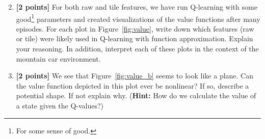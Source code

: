 \documentclass[11pt]{article}
\numberwithin{equation}{section} %
\numberwithin{figure}{section} %
\numberwithin{table}{section} %
\begin{document}
\begin{enumerate}
\setcounter{enumi}{1}
\item \textbf{[2 points]} For both raw and tile features, we have run Q-learning with some good\footnote{For some sense of good.} parameters and created visualizations of the value functions after many episodes. For each plot in Figure~\ref{fig:value}, write down which features (raw or tile) were likely used in Q-learning with function approximation. Explain your reasoning. In addition, interpret each of these plots in the context of the mountain car environment.

\begin{tcolorbox}[fit,height=4cm, width=\linewidth, blank, borderline={1pt}{-2pt},nobeforeafter]
\end{tcolorbox}


\item \textbf{[2 points]} We see that Figure~\ref{fig:value_b} seems to look like a plane. Can the value function depicted in this plot ever be nonlinear? If so, describe a potential shape. If not explain why. (\textbf{Hint:} How do we calculate the value of a state given the Q-values?)


\begin{tcolorbox}[fit,height=4cm, width=\linewidth, blank, borderline={1pt}{-2pt},nobeforeafter]
\end{tcolorbox}

    
\end{enumerate}
\end{document}
